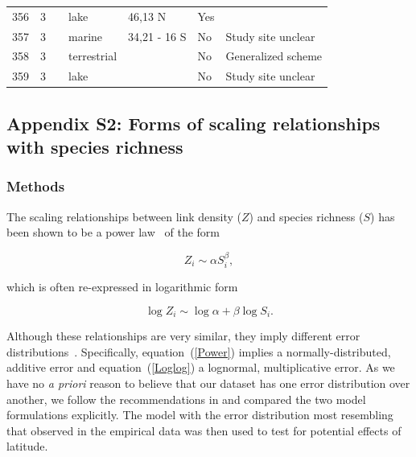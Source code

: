 \documentclass[12pt]{article}
\begin{document}
\begin{landscape}
\begin{table}[h!]
{\begin{tabular}{p{2.8cm}p{1.3cm}p{5.5cm}p{2.2cm}p{2.5cm}lp{3.5cm}}
        356   & 3 & \citet{Cohen2003}    & lake  & 46,13 N & Yes   &       \\
        357   & 3 & \citet{Yodzis1998} & marine & 34,21 - 16 S & No    & Study site unclear \\
        358   & 3 & \citet{Schroter2003}  & terrestrial &       & No    & Generalized scheme \\
        359   & 3 & \citet{Baiser2012}  & lake  &       & No    & Study site unclear \\
        \hline
      \end{tabular}%
        }
    \end{table}%

  \end{landscape}
\newpage

\subsection*{Appendix S2: Forms of scaling relationships with species richness}

  \subsubsection*{Methods}

    The scaling relationships between link density ($Z$) and species richness ($S$)
    has been shown to be a power law~\citep{Riede2010} of the form 

    \begin{equation}
    \label{Power}
    Z_{i} \sim \alpha S_{i}^{\beta}  ,
    \end{equation}

    \noindent which is often re-expressed in logarithmic form 

    \begin{equation}
    \label{Loglog}
    \log{Z_{i}} \sim \log{\alpha} + \beta\log{S_{i}}  .
    \end{equation}

    \noindent Although these relationships are very similar, they imply different error distributions~\citep{Xiao2011}.
    Specifically, equation~(\ref{Power}) implies a normally-distributed, additive error and equation~(\ref{Loglog}) a lognormal,
    multiplicative error. As we have no \emph{a priori} reason to believe that our dataset has one error distribution
    over another, we follow the recommendations in\citet{Xiao2011} and compared the two
    model formulations explicitly. The model with the error distribution most resembling that observed in the empirical
    data was then used to test for potential effects of latitude.
\end{document}

